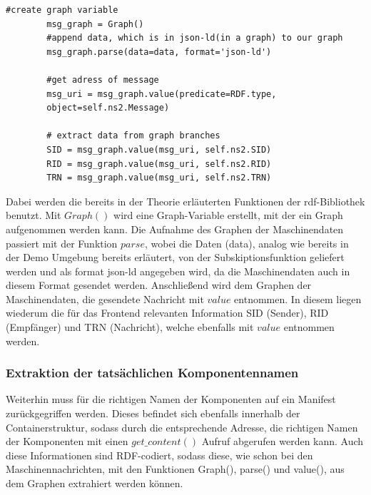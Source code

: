 \documentclass[
	12pt,								%
	DIV10,
	a4paper,         		%
	oneside,						%
	parskip=half,				%
	headings=normal,			%
	listof=totoc,					%
	bibliography=totoc,						%
	index=totoc,						%
	final								%
]{scrartcl}
\begin{document}
\begin{lstlisting}[caption={Extraktion der RDF codierten Maschinennachrichten}, label=hi]
		    #create graph variable
        msg_graph = Graph()
        #append data, which is in json-ld(in a graph) to our graph
        msg_graph.parse(data=data, format='json-ld')
        
        #get adress of message
        msg_uri = msg_graph.value(predicate=RDF.type,
        object=self.ns2.Message) 
        
        # extract data from graph branches
        SID = msg_graph.value(msg_uri, self.ns2.SID)
        RID = msg_graph.value(msg_uri, self.ns2.RID)
        TRN = msg_graph.value(msg_uri, self.ns2.TRN) 
\end{lstlisting}
Dabei werden die bereits in der Theorie erläuterten Funktionen der rdf-Bibliothek benutzt. Mit $Graph()$ wird eine Graph-Variable erstellt, mit der ein Graph aufgenommen werden kann. Die Aufnahme des Graphen der Maschinendaten passiert mit der Funktion $parse$, wobei die Daten (data), analog wie bereits in der Demo Umgebung bereits erläutert, von der Subskiptionsfunktion geliefert werden und als format json-ld angegeben wird, da die Maschinendaten auch in diesem Format gesendet werden. Anschließend wird dem Graphen der Maschinendaten, die gesendete Nachricht mit $value$ entnommen. In diesem liegen wiederum die für das Frontend relevanten Information SID (Sender), RID (Empfänger) und TRN (Nachricht), welche ebenfalls mit $value$ entnommen werden.

\subsubsection*{Extraktion der tatsächlichen Komponentennamen}
Weiterhin muss für die richtigen Namen der Komponenten auf ein Manifest zurückgegriffen werden. Dieses befindet sich ebenfalls innerhalb der Containerstruktur, sodass durch die entsprechende Adresse, die richtigen Namen der Komponenten mit einen $get\_content()$ Aufruf abgerufen werden kann. Auch diese Informationen sind RDF-codiert, sodass diese, wie schon bei den Maschinennachrichten, mit den Funktionen Graph(), parse() und value(), aus dem Graphen extrahiert werden können.
\end{document}
